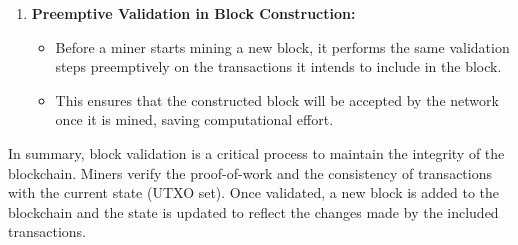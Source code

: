 \begin{enumerate}
\begin{itemize}
    \end{itemize}
    \item \textbf{Preemptive Validation in Block Construction:}
    \begin{itemize}
        \item Before a miner starts mining a new block, it performs the same validation steps preemptively on the transactions it intends to include in the block.
        \item This ensures that the constructed block will be accepted by the network once it is mined, saving computational effort.
    \end{itemize}
\end{enumerate}
In summary, block validation is a critical process to maintain the integrity of the blockchain. Miners verify the proof-of-work and the consistency of transactions with the current state (UTXO set). Once validated, a new block is added to the blockchain and the state is updated to reflect the changes made by the included transactions.
